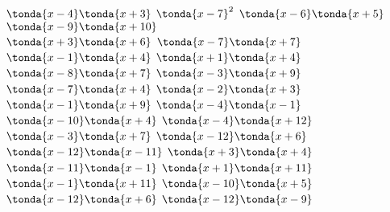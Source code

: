 \begin{esercizio}
\begin{htmulticols}{4}
\begin{enumeratea}
\end{enumeratea}
\end{htmulticols}
\noindent\!\sframeop{} \(\tonda{x - 4} \tonda{x + 3}\) %
\sframeop{} \(\tonda{x - 7}^{2}\) %
\sframeop{} \(\tonda{x - 6} \tonda{x + 5}\) %
\sframeop{} \(\tonda{x - 9} \tonda{x + 10}\) \\[.2em] %
\sframeop{} \(\tonda{x + 3} \tonda{x + 6}\) %
\sframeop{} \(\tonda{x - 7} \tonda{x + 7}\) %
\sframeop{} \(\tonda{x - 1} \tonda{x + 4}\) %
\sframeop{} \(\tonda{x + 1} \tonda{x + 4}\) \\[.2em] %
\sframeop{} \(\tonda{x - 8} \tonda{x + 7}\) %
\sframeop{} \(\tonda{x - 3} \tonda{x + 9}\) %
\sframeop{} \(\tonda{x - 7} \tonda{x + 4}\) %
\sframeop{} \(\tonda{x - 2} \tonda{x + 3}\) \\[.2em] %
\sframeop{} \(\tonda{x - 1} \tonda{x + 9}\) %
\sframeop{} \(\tonda{x - 4} \tonda{x - 1}\) %
\sframeop{} \(\tonda{x - 10} \tonda{x + 4}\) %
\sframeop{} \(\tonda{x - 4} \tonda{x + 12}\) \\[.2em] %
\sframeop{} \(\tonda{x - 3} \tonda{x + 7}\) %
\sframeop{} \(\tonda{x - 12} \tonda{x + 6}\) %
\sframeop{} \(\tonda{x - 12} \tonda{x - 11}\) %
\sframeop{} \(\tonda{x + 3} \tonda{x + 4}\) \\[.2em] %
\sframeop{} \(\tonda{x - 11} \tonda{x - 1}\) %
\sframeop{} \(\tonda{x + 1} \tonda{x + 11}\) %
\sframeop{} \(\tonda{x - 1} \tonda{x + 11}\) %
\sframeop{} \(\tonda{x - 10} \tonda{x + 5}\) \\[.2em] %
\sframeop{} \(\tonda{x - 12} \tonda{x + 6}\) %
\sframeop{} \(\tonda{x - 12} \tonda{x - 9}\) %
\end{esercizio}

